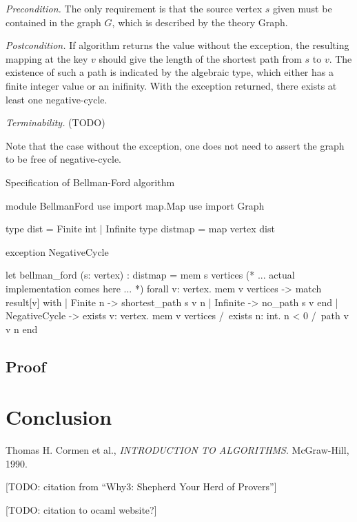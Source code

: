 \documentclass[a4paper,12pt]{article}
\begin{document}
\emph{Precondition.} The only requirement is that the source vertex $ s $ given must be contained in the graph $ G $, which is described by the theory \mbox{\sc Graph}.

\emph{Postcondition.} If algorithm returns the value without the exception, the resulting mapping at the key $ v $ should give the length of the shortest path from $ s $ to $ v $. The existence of such a path is indicated by the algebraic type, which either has a finite integer value or an inifinity. With the exception returned, there exists at least one negative-cycle.

\emph{Terminability.} (TODO)

Note that the case without the exception, one does not need to assert the graph to be free of negative-cycle.








\begin{algorithm}
\caption{Specification of Bellman-Ford algorithm}\label{lst:why_bf}
\begin{why3}[1]
module BellmanFord
  use import map.Map
  use import Graph

  type dist = Finite int | Infinite
  type distmap = map vertex dist

  exception NegativeCycle

  let bellman_ford (s: vertex) : distmap =
    { mem s vertices }
    (* ... actual implementation comes here ... *)
    { forall v: vertex. mem v vertices ->
        match result[v] with
        | Finite n -> shortest_path s v n
        | Infinite -> no_path s v
        end }
    | NegativeCycle ->
    { exists v: vertex. mem v vertices /\
      exists n: int. n < 0 /\ path v v n  }
end
\end{why3}
\end{algorithm}




\subsection{Proof}

\section{Conclusion}



\begin{thebibliography}{9}

  Thomas H. Cormen et al.,
  \emph{INTRODUCTION TO ALGORITHMS}.
  McGraw-Hill,
  1990.


[TODO: citation from ``Why3: Shepherd Your Herd of Provers'']

[TODO: citation to ocaml website?]


\end{thebibliography}
\end{document}
